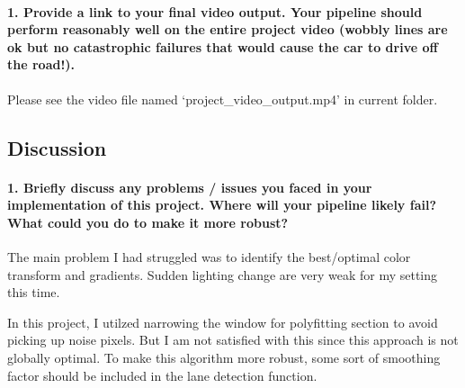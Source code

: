 \documentclass[11pt]{article}
\begin{document}
\hypertarget{provide-a-link-to-your-final-video-output.-your-pipeline-should-perform-reasonably-well-on-the-entire-project-video-wobbly-lines-are-ok-but-no-catastrophic-failures-that-would-cause-the-car-to-drive-off-the-road.}{%
\paragraph{1. Provide a link to your final video output. Your pipeline
should perform reasonably well on the entire project video (wobbly lines
are ok but no catastrophic failures that would cause the car to drive
off the
road!).}\label{provide-a-link-to-your-final-video-output.-your-pipeline-should-perform-reasonably-well-on-the-entire-project-video-wobbly-lines-are-ok-but-no-catastrophic-failures-that-would-cause-the-car-to-drive-off-the-road.}}

Please see the video file named `project\_video\_output.mp4' in current
folder.

    \hypertarget{discussion}{%
\subsection{Discussion}\label{discussion}}

\hypertarget{briefly-discuss-any-problems-issues-you-faced-in-your-implementation-of-this-project.-where-will-your-pipeline-likely-fail-what-could-you-do-to-make-it-more-robust}{%
\paragraph{1. Briefly discuss any problems / issues you faced in your
implementation of this project. Where will your pipeline likely fail?
What could you do to make it more
robust?}\label{briefly-discuss-any-problems-issues-you-faced-in-your-implementation-of-this-project.-where-will-your-pipeline-likely-fail-what-could-you-do-to-make-it-more-robust}}

The main problem I had struggled was to identify the best/optimal color
transform and gradients. Sudden lighting change are very weak for my
setting this time.

In this project, I utilzed narrowing the window for polyfitting section
to avoid picking up noise pixels. But I am not satisfied with this since
this approach is not globally optimal. To make this algorithm more
robust, some sort of smoothing factor should be included in the lane
detection function.


    
    
    
    
\end{document}
